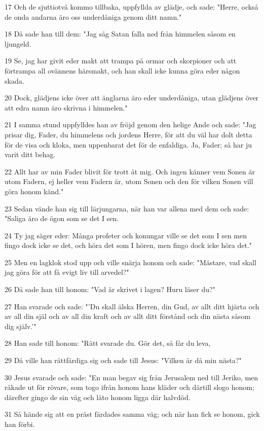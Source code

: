 \par 17 Och de sjuttiotvå kommo tillbaka, uppfyllda av glädje, och sade: "Herre, också de onda andarna äro oss underdåniga genom ditt namn."
\par 18 Då sade han till dem: "Jag såg Satan falla ned från himmelen såsom en ljungeld.
\par 19 Se, jag har givit eder makt att trampa på ormar och skorpioner och att förtrampa all ovännens härsmakt, och han skall icke kunna göra eder någon skada.
\par 20 Dock, glädjens icke över att änglarna äro eder underdåniga, utan glädjens över att edra namn äro skrivna i himmelen."
\par 21 I samma stund uppfylldes han av fröjd genom den helige Ande och sade: "Jag prisar dig, Fader, du himmelens och jordens Herre, för att du väl har dolt detta för de visa och kloka, men uppenbarat det för de enfaldiga. Ja, Fader; så har ju varit ditt behag.
\par 22 Allt har av min Fader blivit för trott åt mig. Och ingen känner vem Sonen är utom Fadern, ej heller vem Fadern är, utom Sonen och den för vilken Sonen vill göra honom känd."
\par 23 Sedan vände han sig till lärjungarna, när han var allena med dem och sade: "Saliga äro de ögon som se det I sen.
\par 24 Ty jag säger eder: Många profeter och konungar ville se det som I sen men fingo dock icke se det, och höra det som I hören, men fingo dock icke höra det."
\par 25 Men en lagklok stod upp och ville snärja honom och sade: "Mästare, vad skall jag göra för att få evigt liv till arvedel?"
\par 26 Då sade han till honom: "Vad är skrivet i lagen? Huru läser du?"
\par 27 Han svarade och sade: "'Du skall älska Herren, din Gud, av allt ditt hjärta och av all din själ och av all din kraft och av allt ditt förstånd och din nästa såsom dig själv.'"
\par 28 Han sade till honom: "Rätt svarade du. Gör det, så får du leva,
\par 29 Då ville han rättfärdiga sig och sade till Jesus: "Vilken är då min nästa?"
\par 30 Jesus svarade och sade: "En man begav sig från Jerusalem ned till Jeriko, men råkade ut för rövare, som togo ifrån honom hans kläder och därtill slogo honom; därefter gingo de sin väg och läto honom ligga där halvdöd.
\par 31 Så hände sig att en präst färdades samma väg; och när han fick se honom, gick han förbi.
